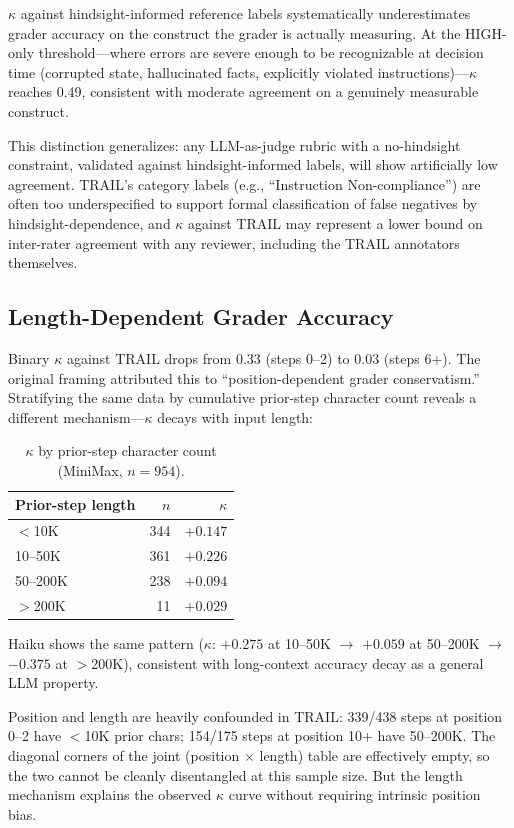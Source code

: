 \documentclass[11pt]{article}
\begin{document}
$\kappa$ against hindsight-informed reference labels systematically underestimates grader accuracy on the construct the grader is actually measuring.
At the HIGH-only threshold---where errors are severe enough to be recognizable at decision time (corrupted state, hallucinated facts, explicitly violated instructions)---$\kappa$ reaches 0.49, consistent with moderate agreement on a genuinely measurable construct.

This distinction generalizes: any LLM-as-judge rubric with a no-hindsight constraint, validated against hindsight-informed labels, will show artificially low agreement.
TRAIL's category labels (e.g., ``Instruction Non-compliance'') are often too underspecified to support formal classification of false negatives by hindsight-dependence, and $\kappa$ against TRAIL may represent a lower bound on inter-rater agreement with any reviewer, including the TRAIL annotators themselves.

\subsection{Length-Dependent Grader Accuracy}

Binary $\kappa$ against TRAIL drops from 0.33 (steps 0--2) to 0.03 (steps 6+).
The original framing attributed this to ``position-dependent grader conservatism.''
Stratifying the same data by cumulative prior-step character count reveals a different mechanism---$\kappa$ decays with input length:

\begin{table}[h]
\centering
\caption{$\kappa$ by prior-step character count (MiniMax, $n=954$).}
\label{tab:length_kappa}
\begin{tabular}{lrr}
\toprule
Prior-step length & $n$ & $\kappa$ \\
\midrule
$<$10K & 344 & $+0.147$ \\
10--50K & 361 & $\mathbf{+0.226}$ \\
50--200K & 238 & $+0.094$ \\
$>$200K & 11 & $+0.029$ \\
\bottomrule
\end{tabular}
\end{table}

Haiku shows the same pattern ($\kappa$: $+0.275$ at 10--50K $\to$ $+0.059$ at 50--200K $\to$ $-0.375$ at $>$200K), consistent with long-context accuracy decay as a general LLM property.

Position and length are heavily confounded in TRAIL: 339/438 steps at position 0--2 have $<$10K prior chars; 154/175 steps at position 10+ have 50--200K.
The diagonal corners of the joint (position $\times$ length) table are effectively empty, so the two cannot be cleanly disentangled at this sample size.
But the length mechanism explains the observed $\kappa$ curve without requiring intrinsic position bias.
\end{document}
